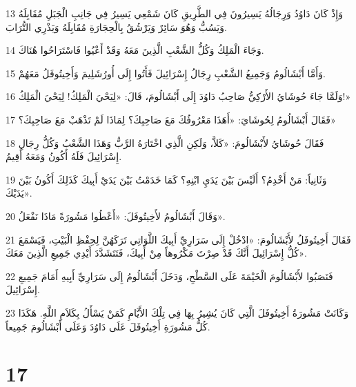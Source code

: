 \par 13 وَإِذْ كَانَ دَاوُدُ وَرِجَالُهُ يَسِيرُونَ فِي الطَّرِيقِ كَانَ شَمْعِي يَسِيرُ فِي جَانِبِ الْجَبَلِ مُقَابِلَهُ وَيَسُبُّ وَهُوَ سَائِرٌ وَيَرْشُقُ بِالْحِجَارَةِ مُقَابِلَهُ وَيَذْرِي التُّرَابَ.
\par 14 وَجَاءَ الْمَلِكُ وَكُلُّ الشَّعْبِ الَّذِينَ مَعَهُ وَقَدْ أَعْيُوا فَاسْتَرَاحُوا هُنَاكَ.
\par 15 وَأَمَّا أَبْشَالُومُ وَجَمِيعُ الشَّعْبِ رِجَالُ إِسْرَائِيلَ فَأَتُوا إِلَى أُورُشَلِيمَ وَأَخِيتُوفَلُ مَعَهُمْ.
\par 16 وَلَمَّا جَاءَ حُوشَايُ الأَرْكِيُّ صَاحِبُ دَاوُدَ إِلَى أَبْشَالُومَ، قَالَ: «لِيَحْيَ الْمَلِكُ! لِيَحْيَ الْمَلِكُ!»
\par 17 فَقَالَ أَبْشَالُومُ لِحُوشَايَ: «أَهَذَا مَعْرُوفُكَ مَعَ صَاحِبِكَ؟ لِمَاذَا لَمْ تَذْهَبْ مَعَ صَاحِبِكَ؟»
\par 18 فَقَالَ حُوشَايُ لأَبْشَالُومَ: «كَلاَّ، وَلَكِنِ الَّذِي اخْتَارَهُ الرَّبُّ وَهَذَا الشَّعْبُ وَكُلُّ رِجَالِ إِسْرَائِيلَ فَلَهُ أَكُونُ وَمَعَهُ أُقِيمُ.
\par 19 وَثَانِياً: مَنْ أَخْدِمُ؟ أَلَيْسَ بَيْنَ يَدَيِ ابْنِهِ؟ كَمَا خَدَمْتُ بَيْنَ يَدَيْ أَبِيكَ كَذَلِكَ أَكُونُ بَيْنَ يَدَيْكَ».
\par 20 وَقَالَ أَبْشَالُومُ لأَخِيتُوفَلَ: «أَعْطُوا مَشُورَةً مَاذَا نَفْعَلُ».
\par 21 فَقَالَ أَخِيتُوفَلُ لأَبْشَالُومَ: «ادْخُلْ إِلَى سَرَارِيِّ أَبِيكَ اللَّوَاتِي تَرَكَهُنَّ لِحِفْظِ الْبَيْتِ، فَيَسْمَعَ كُلُّ إِسْرَائِيلَ أَنَّكَ قَدْ صِرْتَ مَكْرُوهاً مِنْ أَبِيكَ، فَتَتَشَدَّدَ أَيْدِي جَمِيعِ الَّذِينَ مَعَكَ».
\par 22 فَنَصَبُوا لأَبْشَالُومَ الْخَيْمَةَ عَلَى السَّطْحِ، وَدَخَلَ أَبْشَالُومُ إِلَى سَرَارِيِّ أَبِيهِ أَمَامَ جَمِيعِ إِسْرَائِيلَ.
\par 23 وَكَانَتْ مَشُورَةُ أَخِيتُوفَلَ الَّتِي كَانَ يُشِيرُ بِهَا فِي تِلْكَ الأَيَّامِ كَمَنْ يَسْأَلُ بِكَلاَمِ اللَّهِ. هَكَذَا كُلُّ مَشُورَةِ أَخِيتُوفَلَ عَلَى دَاوُدَ وَعَلَى أَبْشَالُومَ جَمِيعاً.

\chapter{17}

